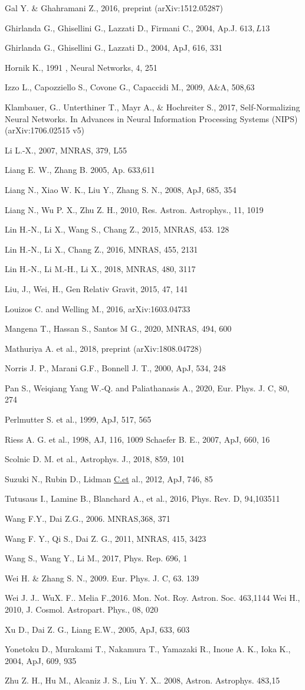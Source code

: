 \documentclass[10pt, a4paper]{article}
\begin{document}
Gal Y. \& Ghahramani Z., 2016, preprint (arXiv:1512.05287)

Ghirlanda G., Ghisellini G., Lazzati D., Firmani C., 2004, Ap.J. $613, L 13$

Ghirlanda G., Ghisellini G., Lazzati D., 2004, ApJ, 616, 331

Hornik K., 1991 , Neural Networks, 4, 251

Izzo L., Capozziello S., Covone G., Capaccidi M., 2009, A\&A, 508,63

Klambauer, G.. Unterthiner T., Mayr A., \& Hochreiter S., 2017, Self-Normalizing Neural Networks. In Advances in Neural Information Processing Systems (NIPS) (arXiv:1706.02515 v5)

Li L.-X., 2007, MNRAS, 379, L55

Liang E. W., Zhang B. 2005, Ap. 633,611

Liang N., Xiao W. K., Liu Y., Zhang S. N., 2008, ApJ, 685, 354

Liang N., Wu P. X., Zhu Z. H., 2010, Res. Astron. Astrophys., 11, 1019

Lin H.-N., Li X., Wang S., Chang Z., 2015, MNRAS, 453. 128

Lin H.-N., Li X., Chang Z., 2016, MNRAS, 455, 2131

Lin H.-N., Li M.-H., Li X., 2018, MNRAS, 480, 3117

Liu, J., Wei, H., Gen Relativ Gravit, 2015, 47, 141

Louizos C. and Welling M., 2016, arXiv:1603.04733

Mangena T., Hassan S., Santos M G., 2020, MNRAS, 494, 600

Mathuriya A. et al., 2018, preprint (arXiv:1808.04728)

Norris J. P., Marani G.F., Bonnell J. T., 2000, ApJ, 534, 248

Pan S., Weiqiang Yang W.-Q. and Paliathanasis A., 2020, Eur. Phys. J. C, 80, 274

Perlmutter S. et al., 1999, ApJ, 517, 565

Riess A. G. et al., 1998, AJ, 116, 1009 Schaefer B. E., 2007, ApJ, 660, 16

Scolnic D. M. et al., Astrophys. J., 2018, 859, 101

Suzuki N., Rubin D., Lidman \href{http://C.et}{C.et} al., 2012, ApJ, 746, 85

Tutusaus I., Lamine B., Blanchard A., et al., 2016, Phys. Rev. D, 94,103511

Wang F.Y., Dai Z.G., 2006. MNRAS,368, 371

Wang F. Y., Qi S., Dai Z. G., 2011, MNRAS, 415, 3423

Wang S., Wang Y., Li M., 2017, Phys. Rep. 696, 1

Wei H. \& Zhang S. N., 2009. Eur. Phys. J. C, 63. 139

Wei J. J.. WuX. F.. Melia F.,2016. Mon. Not. Roy. Astron. Soc. 463,1144 Wei H., 2010, J. Cosmol. Astropart. Phys., 08, 020

Xu D., Dai Z. G., Liang E.W., 2005, ApJ, 633, 603

Yonetoku D., Murakami T., Nakamura T., Yamazaki R., Inoue A. K., Ioka K., 2004, ApJ, 609, 935

Zhu Z. H., Hu M., Alcaniz J. S., Liu Y. X.. 2008, Astron. Astrophys. 483,15
\end{document}
